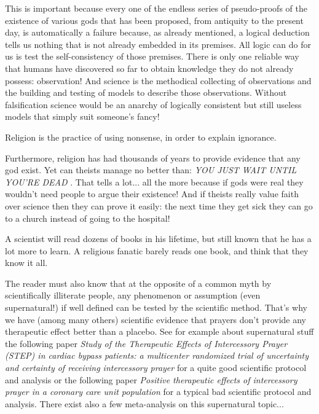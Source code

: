 	This is important because every one of the endless series of pseudo-proofs of the existence of various gods that has been proposed, from antiquity to the present day, is automatically a failure because, as already mentioned, a logical deduction tells us nothing that is not already embedded in its premises. All logic can do for us is test the self-consistency of those premises. There is only one reliable way that humans have discovered so far to obtain knowledge they do not already possess: observation! And science is the methodical collecting of observations and the building and testing of models to describe those observations. Without falsification science would be an anarchy of logically consistent but still useless models that simply suit someone's fancy!
	
	\begin{fquote}Religion is the practice of using nonsense, in order to explain ignorance.
 	\end{fquote}
	
	Furthermore, religion has had thousands of years to provide evidence that any god exist. Yet can theists manage no better than: \og \textit{YOU JUST WAIT UNTIL YOU'RE DEAD} \fg{}. That tells a lot... all the more because if gods were real they wouldn't need people to argue their existence! And if theists really value faith over science then they can prove it easily: the next time they get sick they can go to a church instead of going to the hospital!
	
	\begin{fquote}A scientist will read dozens of books in his lifetime, but still known that he has a lot more to learn. A religious fanatic barely reads one book, and think that they know it all.
 	\end{fquote}

	The reader must also know that at the opposite of a common myth by scientifically illiterate people, any phenomenon or assumption (even supernatural!) if well defined can be tested by the scientific method. That's why we have (among many others) scientific evidence that prayers don't provide any therapeutic effect better than a placebo. See for example about supernatural stuff the following paper \textit{Study of the Therapeutic Effects of Intercessory Prayer (STEP) in cardiac bypass patients: a multicenter randomized trial of uncertainty and certainty of receiving intercessory prayer} \cite{benson2006study} for a quite good scientific protocol and analysis or the following paper \textit{Positive therapeutic effects of intercessory prayer in a coronary care unit population} \cite{byrd1988positive} for a typical bad scientific protocol and analysis. There exist also a few meta-analysis on this supernatural topic...
	
